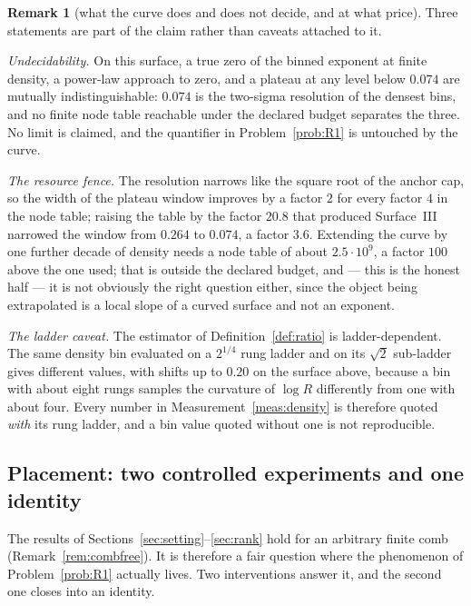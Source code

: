 \documentclass[11pt,a4paper]{article}
\theoremstyle{plain}
\theoremstyle{definition}
\newtheorem{remark}[theorem]{Remark}
\begin{document}
\begin{remark}[what the curve does and does not decide, and at what price]
\label{rem:undecidable}
Three statements are part of the claim rather than caveats attached to it.

\emph{Undecidability.} On this surface, a true zero of the binned exponent at
finite density, a power-law approach to zero, and a plateau at any level below
$0.074$ are mutually indistinguishable: $0.074$ is the two-sigma resolution of
the densest bins, and no finite node table reachable under the declared budget
separates the three. No limit is claimed, and the quantifier in
Problem~\ref{prob:R1} is untouched by the curve.

\emph{The resource fence.} The resolution narrows like the square root of the
anchor cap, so the width of the plateau window improves by a factor $2$ for
every factor $4$ in the node table; raising the table by the factor $20.8$ that
produced Surface~III narrowed the window from $0.264$ to $0.074$, a factor
$3.6$. Extending the curve by one further decade of
density needs a node table of about $2.5\cdot10^{9}$, a factor $100$ above the
one used; that is outside the declared budget, and --- this is the honest half
--- it is not obviously the right question either, since the object being
extrapolated is a local slope of a curved surface and not an exponent.

\emph{The ladder caveat.} The estimator of Definition~\ref{def:ratio} is
ladder-dependent. The same density bin evaluated on a $2^{1/4}$ rung ladder and
on its $\sqrt2$ sub-ladder gives different values, with shifts up to $0.20$ on
the surface above, because a bin with about eight rungs samples the curvature of
$\log R$ differently from one with about four. Every number in
Measurement~\ref{meas:density} is therefore quoted \emph{with} its rung ladder,
and a bin value quoted without one is not reproducible.
\end{remark}

\subsection{Placement: two controlled experiments and one identity}
\label{sec:placement}

The results of Sections~\ref{sec:setting}--\ref{sec:rank} hold for an arbitrary
finite comb (Remark~\ref{rem:combfree}). It is therefore a fair question where
the phenomenon of Problem~\ref{prob:R1} actually lives. Two interventions answer
it, and the second one closes into an identity.
\end{document}
